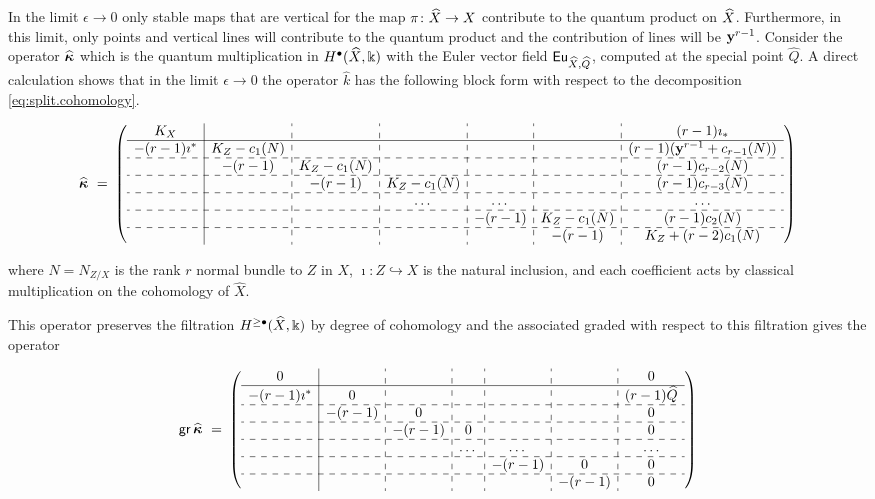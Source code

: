 \documentclass[twoside,leqno]{article}
\numberwithin{equation}{section}
\theoremstyle{plain}
\theoremstyle{definition}
\begin{document}
\medskip


In the limit $\epsilon \to 0$ only stable maps that are vertical 
for the map $\pi \colon \widehat{X} \to X$ contribute to the  quantum product on $\widehat{X}$. 
Furthermore, in this limit, only points and vertical lines will contribute to the quantum product and the contribution of lines will be $\mathbf{y}^{r-1}$.   
Consider the operator $\widehat{\boldsymbol{\kappa}}$ which is the quantum multiplication in $H^{\bullet}(\widehat{X},\Bbbk)$ with the Euler vector field $\operatorname{\mathsf{Eu}}_{\widehat{X},\widehat{Q}}$, computed at the special point $\widehat{Q}$.  A direct calculation shows that in the limit $\epsilon \to 0$ the operator $\widehat{k}$ has the following  block form  with respect to the decomposition \eqref{eq:split.cohomology}.


{\tiny
\[
\text{\normalsize $\widehat{\bkappa} \ = \ $} \left(\begin{array}{c|c:c:c:c:c:c}
K_X&&&& &&(r-1)\imath_*\\
\hline -(r-1)\imath^*& K_Z-c_1(N)&&&&& (r-1)(\fy^{r-1}+c_{r-1}(N))\\
\hdashline & -(r-1) &K_Z-c_1(N)&&& &(r-1)c_{r-2}(N)\\
\hdashline && -(r-1) &K_Z-c_1(N)&&& (r-1)c_{r-3}(N)\\
\hdashline &&&\dots  &\dots& &\dots\\
\hdashline &&&&-(r-1)& K_Z-c_1(N) &(r-1) c_2(N)\\
\hdashline &&&& &-(r-1)&K_Z+(r-2)c_1(N)\end{array}\right)
\]
}


where $N = N_{Z/X}$ is the rank $r$  normal bundle to $Z$ in $X$, $\imath:Z \hookrightarrow X$ is the natural inclusion, and each coefficient acts by classical multiplication on the cohomology of $\widehat{X}$.

\medskip


This operator preserves the filtration $H^{\geq \bullet}(\widehat{X},\Bbbk)$ by degree of cohomology and the associated graded with respect to this filtration  gives the operator


{\tiny
\[
\text{\normalsize $\mathsf{gr} \, \widehat{\bkappa} \ = \ $} 
\left(\begin{array}{c|c:c:c:c:c:c}
0&&&&&& 0\\
\hline
-(r-1)\imath^{*} & 0 &&&&& (r-1)\widehat{Q}\\
 \hdashline
 & -(r-1) & 0 &&& & 0 \\
\hdashline && -(r-1) & 0 &&& 0 \\
\hdashline &&&\dots  &\dots& &\dots\\
\hdashline &&&&-(r-1)& 0 & 0\\
\hdashline &&&& &-(r-1)& 0\end{array}\right)
\]
}
\end{document}
